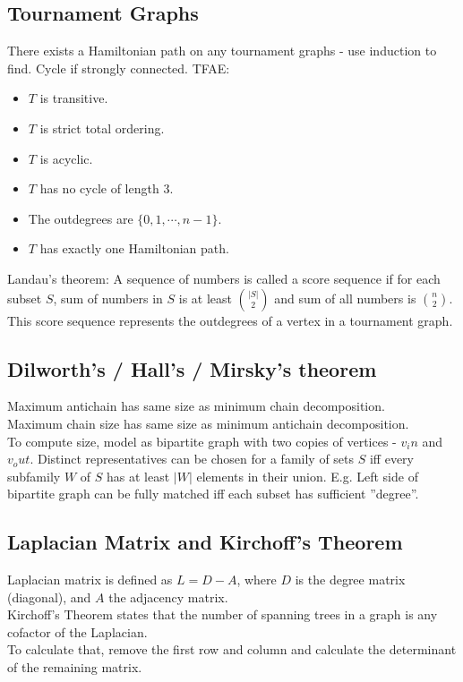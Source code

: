     \subsection{Tournament Graphs}
    There exists a Hamiltonian path on any tournament graphs - use induction to find. Cycle if strongly connected. TFAE:
    \begin{itemize}
      \item
      $T$ is transitive.
      \item
      $T$ is strict total ordering.
      \item
      $T$ is acyclic.
      \item
      $T$ has no cycle of length $3$.
      \item
      The outdegrees are $\{0, 1, \cdots, n-1\}$.
      \item
      $T$ has exactly one Hamiltonian path.
    \end{itemize}
    Landau's theorem: A sequence of numbers is called a score sequence if for each subset $S$, sum of 
    numbers in $S$ is at least $\binom{|S|}{2}$ and sum of all numbers is $\binom{n}{2}$.\\
    This score sequence represents the outdegrees of a vertex in a tournament graph.

    \subsection{Dilworth's / Hall's / Mirsky's theorem}
    Maximum antichain has same size as minimum chain decomposition.\\
    Maximum chain size has same size as minimum antichain decomposition.\\
    To compute size, model as bipartite graph with two copies of vertices - $v_in$ and $v_out$.
    Distinct representatives can be chosen for a family of sets $S$ iff every subfamily $W$ of $S$ has at least $|W|$
    elements in their union. E.g. Left side of bipartite graph can be fully matched iff each subset has sufficient ”degree”.

    \subsection{Laplacian Matrix and Kirchoff’s Theorem}

    Laplacian matrix is defined as $L = D - A$, where $D$ is the degree matrix (diagonal), and $A$ the adjacency matrix.\\
    Kirchoff’s Theorem states that the number of spanning trees in a graph is any cofactor of the Laplacian.\\
    To calculate that, remove the first row and column and calculate the determinant of the remaining matrix.




